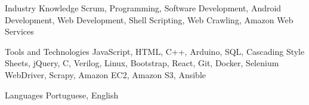 


\begin{cvskills}


\cvskill
{Industry Knowledge} %
{Scrum, Programming, Software Development, Android Development, Web Development, \hfill \break Shell Scripting, Web Crawling, Amazon Web Services} %


\cvskill
{Tools and Technologies} %
{JavaScript, HTML, C++, Arduino, SQL, Cascading Style Sheets, jQuery, C, Verilog, Linux, Bootstrap, \hfill \break React, Git, Docker, Selenium WebDriver, Scrapy, Amazon EC2, Amazon S3, Ansible} %


\cvskill
{Languages} %
{Portuguese, English} %


\end{cvskills}